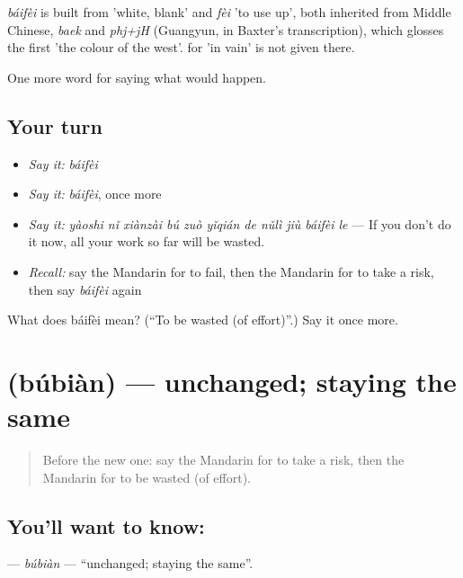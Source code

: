 \begin{cousinweb}
\emph{báifèi} is built from  'white, blank' and \emph{fèi} 'to use up', both inherited from Middle Chinese, \emph{baek} and \emph{phj+jH} (Guangyun, in Baxter's transcription), which glosses the first 'the colour of the west'.  for 'in vain' is not given there.
\end{cousinweb}

\begin{grammarlens}[title={What you've built}]
One more word for saying what would happen.
\end{grammarlens}

\subsection*{Your turn}
\begin{itemize}
\raggedright
  \item \emph{Say it:} \emph{báifèi}
  \item \emph{Say it:} \emph{báifèi}, once more
  \item \emph{Say it:} \emph{yàoshi nǐ xiànzài bú zuò yǐqián de nǔlì jiù báifèi le} — If you don't do it now, all your work so far will be wasted.
  \item \emph{Recall:} say the Mandarin for to fail, then the Mandarin for to take a risk, then say \emph{báifèi} again
\end{itemize}

\begin{tcolorbox}[breakable,colback=teal!4,colframe=teal!35!black,title={Before you move on}]
What does báifèi mean? (\textquotedblleft{}To be wasted (of effort)\textquotedblright{}.) Say it once more.
\end{tcolorbox}
\section[\texorpdfstring{\zh{不变} (búbiàn)}{不变 (búbiàn)}]{ (búbiàn) — unchanged; staying the same}

\label{lesson:ZH-C394-bubian}



\begin{quote}
Before the new one: say the Mandarin for to take a risk, then the Mandarin for to be wasted (of effort).
\end{quote}

\subsection*{You'll want to know: }
\textbf{} — \emph{búbiàn} — \textquotedblleft{}unchanged; staying the same\textquotedblright{}.


